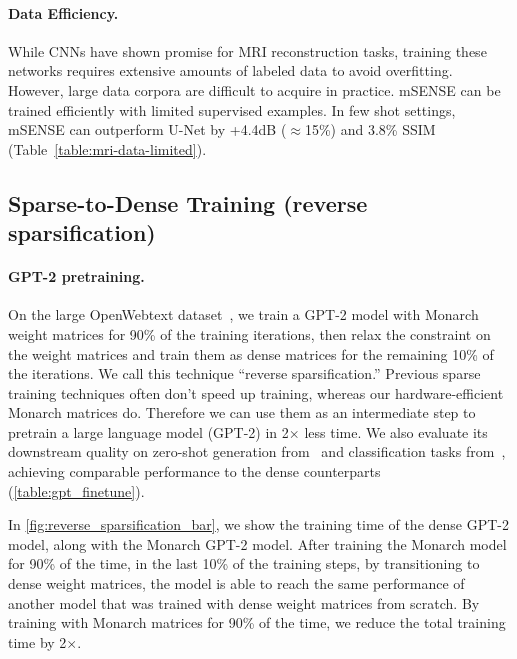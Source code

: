 \paragraph{Data Efficiency.} While CNNs have shown promise for MRI reconstruction tasks, training these networks requires extensive amounts of labeled data to avoid overfitting. However, large data corpora are difficult to acquire in practice. mSENSE can be trained efficiently with limited supervised examples. In few shot settings, mSENSE can outperform U-Net by +4.4dB ($\approx$15\%) and 3.8\% SSIM (Table~\ref{table:mri-data-limited}). 

\subsection{Sparse-to-Dense Training (reverse sparsification)}
\label{subsec:s2d_training}
\paragraph{GPT-2 pretraining.} On the large OpenWebtext dataset~\citep{Gokaslan2019OpenWeb}, we train a GPT-2 model with Monarch weight matrices for 90\% of the training iterations, then relax the constraint on the weight matrices and train them as dense matrices for the remaining 10\% of the iterations. We call this technique ``reverse sparsification.'' Previous sparse training techniques often don't speed up training, whereas our hardware-efficient Monarch matrices do. Therefore we can use them as an intermediate step to pretrain a large language model (GPT-2) in 2$\times$ less time. We also evaluate its downstream quality on zero-shot generation from~\citep{eval-harness} and classification tasks from~\citep{zhao2021calibrate}, achieving comparable performance to the dense counterparts (\ref{table:gpt_finetune}). 

In \ref{fig:reverse_sparsification_bar}, we show the training time of the dense GPT-2 model, along with the Monarch GPT-2 model. After training the Monarch model for 90\% of the time, in the last 10\% of the training steps, by transitioning to dense weight matrices, the model is able to reach the same performance of another model that was trained with dense weight matrices from scratch. By training with Monarch matrices for 90\% of the time, we reduce the total training time by 2$\times$.

